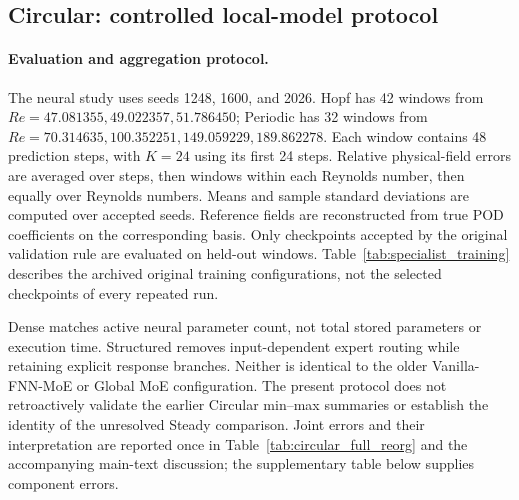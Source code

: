 \subsection{Circular: controlled local-model protocol}
\label{app:circular}

\paragraph{Evaluation and aggregation protocol.}
The neural study uses seeds 1248, 1600, and 2026.
Hopf has 42 windows from
$Re=47.081355,49.022357,51.786450$; Periodic has 32 windows from
$Re=70.314635,100.352251,149.059229,189.862278$.
Each window contains 48 prediction steps, with $K=24$ using its
first 24 steps. Relative physical-field errors are averaged over
steps, then windows within each Reynolds number, then equally over
Reynolds numbers. Means and sample standard deviations are computed
over accepted seeds. Reference fields are reconstructed from true
POD coefficients on the corresponding basis.
Only checkpoints accepted by the original validation rule are
evaluated on held-out windows.
Table~\ref{tab:specialist_training} describes the archived original
training configurations, not the selected checkpoints of every
repeated run.

Dense matches active neural parameter count, not total stored
parameters or execution time. Structured removes input-dependent
expert routing while retaining explicit response branches.
Neither is identical to the older Vanilla-FNN-MoE or Global MoE
configuration. The present protocol does not retroactively validate
the earlier Circular min--max summaries or establish the identity
of the unresolved Steady comparison.
Joint errors and their interpretation are reported once in
Table~\ref{tab:circular_full_reorg} and the accompanying main-text
discussion; the supplementary table below supplies component errors.

